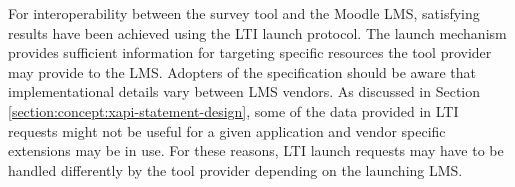     For interoperability between the survey tool and the Moodle LMS, satisfying
    results have been achieved using the LTI launch protocol. The launch
    mechanism provides sufficient information for targeting specific resources
    the tool provider may provide to the LMS. Adopters of the specification
    should be aware that implementational details vary between LMS vendors.
    As discussed in Section \ref{section:concept:xapi-statement-design},
    some of the data provided in LTI requests might not be useful for a
    given application and vendor specific extensions may be in use.
    For these reasons, LTI launch requests may have to be handled
    differently by the tool provider depending on the launching LMS.